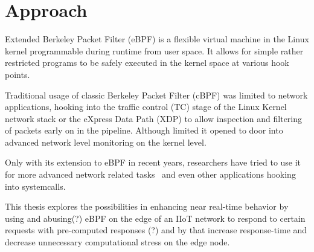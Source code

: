 \section{Approach}


Extended Berkeley Packet Filter (eBPF) is a flexible virtual machine in the
Linux kernel programmable during runtime from user space. It allows for simple
rather restricted programs to be safely executed in the kernel space at various
hook points.


Traditional usage of classic Berkeley Packet Filter (cBPF) was limited to
network applications, hooking into the traffic control (TC) stage of the Linux
Kernel network stack or the eXpress Data Path (XDP) to allow inspection and
filtering of packets early on in the pipeline. Although limited it opened to
door into advanced network level monitoring on the kernel level.

Only with its extension to eBPF in recent years, researchers have tried to use
it for more advanced network related tasks~\cite{miano_creating_2018} and even
other applications hooking into systemcalls.

This thesis explores the possibilities in enhancing near real-time behavior by
using and abusing(?) eBPF on the edge of an IIoT network to
respond to certain requests with pre-computed responses (?) and by that increase
response-time and decrease unnecessary computational stress on the edge node.
